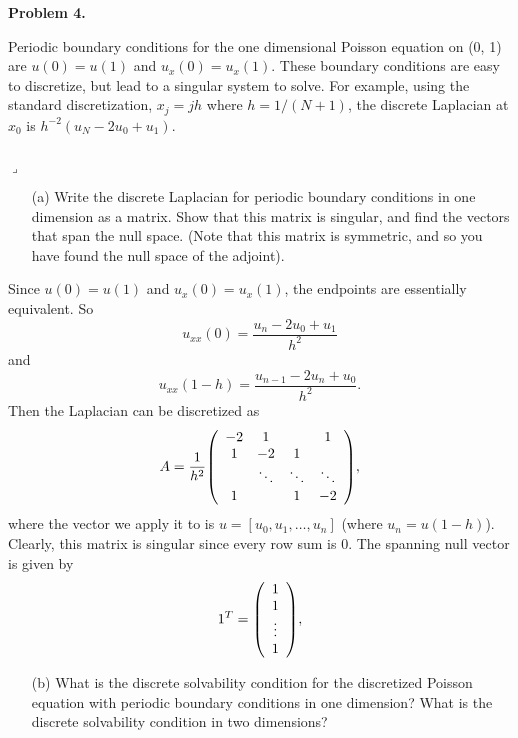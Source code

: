 \documentclass[12pt]{article}
\newenvironment{myprob}[1]
    {%
    \noindent{\Huge$\ulcorner$}\textbf{#1.}\begin{em}
    }
    { 
    \end{em} \\ \hphantom{l} \hfill {\Huge$\lrcorner$} }
\begin{document}
\begin{myprob}{Problem 4}
 Periodic boundary conditions for the one dimensional Poisson equation on (0, 1) are $u(0) =u(1)$ and $u_x(0) = u_x(1)$. These boundary conditions are easy to discretize, but lead to a singular system to solve. For example, using the standard discretization, $x_j = jh$ where $h = 1/(N + 1)$, the discrete Laplacian at $x_0$ is $h^{-2}(u_N - 2u_0 + u_1)$.
\end{myprob}

\begin{itemize}
\item[(a)]  Write the discrete Laplacian for periodic boundary conditions in one dimension as a
matrix. Show that this matrix is singular, and find the vectors that span the null space.
(Note that this matrix is symmetric, and so you have found the null space of the adjoint).
\end{itemize}
Since $u(0) = u(1)$ and $u_x(0) = u_x(1)$, the endpoints are essentially equivalent. So $$u_{xx}(0) = \dfrac{u_n - 2u_0 +u_1 }{h^2}$$ and $$u_{xx}(1-h) = \dfrac{u_{n-1} - 2u_n +u_0 }{h^2}.$$  Then the Laplacian can be discretized as 
$$A = \dfrac{1}{h^2}\qty(\begin{array}{cccc}
                    -2 & 1 & & 1 \\
                    1 & -2 & 1 & \\
                    & \ddots & \ddots & \ddots  \\
                    1 & & 1 & -2
                \end{array}), $$
where the vector we apply it to is $u = [u_0, u_1, \dots, u_n]$ (where $u_n = u(1-h)$).
Clearly, this matrix is singular since every row sum is 0.  The spanning null vector is given by
$$1^T = \qty(\begin{array}{c}
                    1 \\
                    1  \\
                    \vdots  \\
                    1 
                \end{array}), $$

\begin{itemize}
\item[(b)] What is the discrete solvability condition for the discretized Poisson equation with periodic boundary conditions in one dimension? What is the discrete solvability condition
in two dimensions?
\end{itemize}
\end{document}
